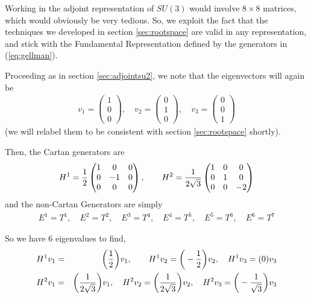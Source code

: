 \documentclass[12pt,epsf]{article}
\def\nolabel{\nonumber }
\def\nolabel{\nonumber }
\begin{document}
Working in the adjoint representation of $SU(3)$ would involve $8
\times 8$ matrices, which would obviously be very tedious.  So, we
exploit the fact that the techniques we developed in section
\ref{sec:rootspace} are valid in any representation, and stick with the
Fundamental Representation defined by the generators in
(\ref{eq:gellman}).  

Proceeding as in section \ref{sec:adjointsu2}, we note that the
eigenvectors will again be 
\begin{eqnarray}
v_1 = 
\begin{pmatrix}
1 \\ 0 \\ 0 
\end{pmatrix}, \quad v_2 = 
\begin{pmatrix}
0 \\ 1 \\ 0
\end{pmatrix}, \quad v_3 = 
\begin{pmatrix}
0 \\ 0 \\ 1
\end{pmatrix}\nolabel
\end{eqnarray}
(we will relabel them to be consistent with section \ref{sec:rootspace}
shortly).  

Then, the Cartan generators are 
\begin{eqnarray}
H^1 = {1\over 2}
\begin{pmatrix}
1 & 0 & 0 \\ 0 & -1 & 0 \\ 0 & 0 & 0
\end{pmatrix}, \qquad H^2 = {1\over 2 \sqrt{3}}
\begin{pmatrix}
1 & 0 & 0 \\ 0 & 1 & 0 \\ 0 & 0 & -2
\end{pmatrix}\nolabel
\end{eqnarray}
and the non-Cartan Generators are simply 
\begin{eqnarray}
E^1 = T^1, \quad E^2 = T^2, \quad E^3 = T^4, \quad E^4 = T^5, \quad E^5
= T^6, \quad E^6 = T^7\nolabel
\end{eqnarray}

So we have 6 eigenvalues to find,
\begin{eqnarray}
H^1v_1 &=& \bigg({1\over 2}\bigg)v_1,\qquad H^1v_2 = \bigg(-{1\over
2}\bigg)v_2, \quad H^1v_3 = (0)v_3 \nolabel \\
H^2v_1 &=& \bigg({1\over 2\sqrt{3}}\bigg)v_1, \quad H^2v_2 =
\bigg({1\over 2\sqrt{3}}\bigg)v_2,\quad H^2 v_3 = \bigg(-{1\over
\sqrt{3}}\bigg)v_3\nolabel
\end{eqnarray}
\end{document}
